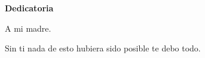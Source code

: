 \begin{center}
	{\large \bfseries  Dedicatoria}
\end{center}
\vspace{0.5cm}

A mi madre.

Sin ti nada de esto hubiera sido posible te debo todo.
\newline

